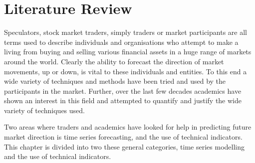 
\chapter{Literature Review} %

\label{Chapter2} %





Speculators, stock market traders, simply traders or market participants are all terms used to describe individuals and organisations who attempt to make a living from buying and selling various financial assets in a huge range of markets around the world. Clearly the ability to forecast the direction of market movements, up or down, is vital to these individuals and entities. To this end a wide variety of techniques and methods have been tried and used by the participants in the market. Further, over the last few decades academics have shown an interest in this field and attempted to quantify and justify the wide variety of techniques used. 

Two areas where traders and academics have looked for help in predicting future market direction is time series forecasting, and the use of technical indicators. This chapter is divided into two these general categories, time series modelling and the use of technical indicators. 


